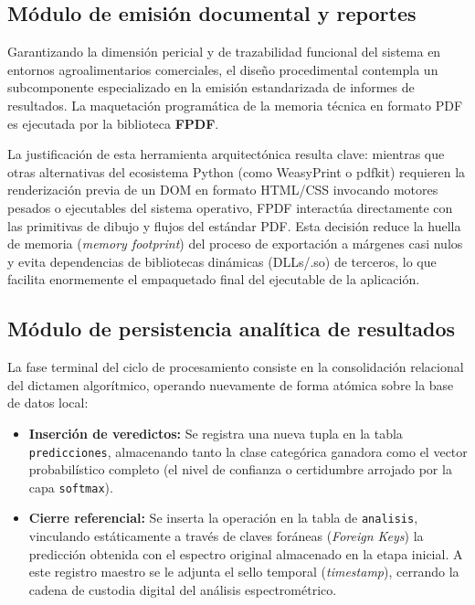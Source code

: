\subsection*{Módulo de emisión documental y reportes}

Garantizando la dimensión pericial y de trazabilidad funcional del sistema en entornos agroalimentarios comerciales, el diseño procedimental contempla un subcomponente especializado en la emisión estandarizada de informes de resultados. La maquetación programática de la memoria técnica en formato PDF es ejecutada por la biblioteca \textbf{FPDF}. 

La justificación de esta herramienta arquitectónica resulta clave: mientras que otras alternativas del ecosistema Python (como WeasyPrint o pdfkit) requieren la renderización previa de un DOM en formato HTML/CSS invocando motores pesados o ejecutables del sistema operativo, FPDF interactúa directamente con las primitivas de dibujo y flujos del estándar PDF. Esta decisión reduce la huella de memoria (\textit{memory footprint}) del proceso de exportación a márgenes casi nulos y evita dependencias de bibliotecas dinámicas (DLLs/.so) de terceros, lo que facilita enormemente el empaquetado final del ejecutable de la aplicación.

\subsection*{Módulo de persistencia analítica de resultados}

La fase terminal del ciclo de procesamiento consiste en la consolidación relacional del dictamen algorítmico, operando nuevamente de forma atómica sobre la base de datos local:

\begin{itemize}
    \item \textbf{Inserción de veredictos:} Se registra una nueva tupla en la tabla \texttt{predicciones}, almacenando tanto la clase categórica ganadora como el vector probabilístico completo (el nivel de confianza o certidumbre arrojado por la capa \texttt{softmax}).
    \item \textbf{Cierre referencial:} Se inserta la operación en la tabla de \texttt{analisis}, vinculando estáticamente a través de claves foráneas (\textit{Foreign Keys}) la predicción obtenida con el espectro original almacenado en la etapa inicial. A este registro maestro se le adjunta el sello temporal (\textit{timestamp}), cerrando la cadena de custodia digital del análisis espectrométrico.
\end{itemize}
\newpage
